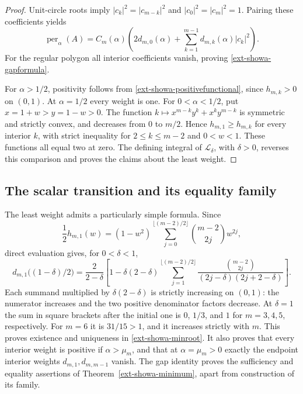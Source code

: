 \documentclass[11pt,a4paper]{article}
\theoremstyle{definition}\newtheorem{definition}[theorem]{Definition}
\theoremstyle{remark}\newtheorem{remark}[theorem]{Remark}
\numberwithin{equation}{section}
\begin{document}
\begin{proof}
Unit-circle roots imply $|c_k|^2=|c_{m-k}|^2$ and
$|c_0|^2=|c_m|^2=1$. Pairing these coefficients yields
\[
 \operatorname{per}_{\alpha}(A)
 =C_m(\alpha)\left(2d_{m,0}(\alpha)
       +\sum_{k=1}^{m-1}d_{m,k}(\alpha)|c_k|^2\right).
\]
For the regular polygon all interior coefficients vanish, proving
\eqref{ext-showa-gapformula}.

For $\alpha>1/2$, positivity follows from
\eqref{ext-showa-positivefunctional}, since $h_{m,k}>0$ on $(0,1)$.
At $\alpha=1/2$ every weight is one. For $0<\alpha<1/2$, put
$x=1+w>y=1-w>0$. The function
$k\mapsto x^{m-k}y^k+x^ky^{m-k}$ is symmetric and strictly convex,
and decreases from $0$ to $m/2$. Hence
$h_{m,1}\ge h_{m,k}$ for every interior $k$, with strict inequality
for $2\le k\le m-2$ and $0<w<1$. These functions all equal two at
zero. The defining integral of $\mathcal L_\delta$, with $\delta>0$,
reverses this comparison and proves the claims about the least weight.
\end{proof}

\subsection{The scalar transition and its equality family}

The least weight admits a particularly simple formula. Since
\[
 \frac12h_{m,1}(w)
  =(1-w^2)\sum_{j=0}^{\lfloor(m-2)/2\rfloor}\binom{m-2}{2j}w^{2j},
\]
direct evaluation gives, for $0<\delta<1$,
\begin{equation}\label{ext-showa-leastweight}
 d_{m,1}\bigl((1-\delta)/2\bigr)
 =\frac2{2-\delta}\left[1-\delta(2-\delta)
  \sum_{j=1}^{\lfloor(m-2)/2\rfloor}
  \frac{\binom{m-2}{2j}}{(2j-\delta)(2j+2-\delta)}\right].
\end{equation}
Each summand multiplied by $\delta(2-\delta)$ is strictly increasing
on $(0,1)$: the numerator increases and the two positive denominator
factors decrease. At $\delta=1$ the sum in square brackets after the
initial one is $0$, $1/3$, and $1$ for $m=3,4,5$, respectively.
For $m=6$ it is $31/15>1$, and it increases strictly with $m$.
This proves existence and uniqueness in \eqref{ext-showa-minroot}.
It also proves that every interior weight is positive if
$\alpha>\mu_m$, and that at $\alpha=\mu_m>0$ exactly the endpoint
interior weights $d_{m,1},d_{m,m-1}$ vanish. The gap identity proves
the sufficiency and equality assertions of
Theorem~\ref{ext-showa-minimum}, apart from construction of its family.
\end{document}
